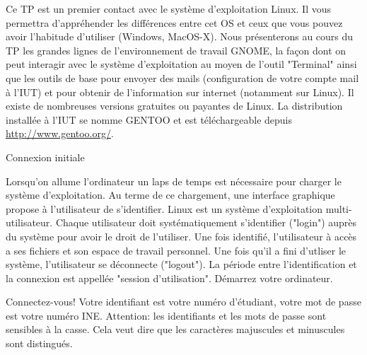\begin{exercice}
  Ce TP est un premier contact avec le système d'exploitation Linux. Il
  vous permettra d'appréhender les différences entre cet OS et ceux que
  vous pouvez avoir l'habitude d'utiliser (Windows, MacOS-X). Nous
  présenterons au cours du TP les grandes lignes de l'environnement de
  travail GNOME, la façon dont on peut interagir avec le système
  d'exploitation au moyen de l'outil "Terminal" ainsi que les outils de
  base pour envoyer des mails (configuration de votre compte mail à
  l'IUT) et pour obtenir de l'information sur internet (notamment sur
  Linux). Il existe de nombreuses versions gratuites ou payantes de
  Linux. La distribution installée à l'IUT se nomme GENTOO et est
  téléchargeable depuis \url{http://www.gentoo.org/}.
  \begin{exercicelet}{Connexion initiale}
    \begin{questions}
    \item Lorsqu'on allume l'ordinateur un laps de temps est nécessaire
      pour charger le système d'exploitation. Au terme de ce chargement,
      une interface graphique propose à l'utilisateur de s'identifier.
      Linux est un système d'exploitation multi-utilisateur. Chaque
      utilisateur doit systématiquement s'identifier ("login") auprès du
      système pour avoir le droit de l'utiliser. Une fois identifié,
      l'utilisateur à accès a ses fichiers et son espace de travail
      personnel. Une fois qu'il a fini d'utliser le système,
      l'utilisateur se déconnecte ("logout"). La période entre
      l'identification et la connexion est appellée "session
      d'utilisation". Démarrez votre ordinateur.
    \item Connectez-vous! Votre identifiant est votre numéro d'étudiant,
      votre mot de passe est votre numéro INE.  Attention: les
      identifiants et les mots de passe sont sensibles à la casse. Cela
      veut dire que les caractères majuscules et minuscules sont
      distingués.
    \end{questions}
  \end{exercicelet}
\end{exercice}


